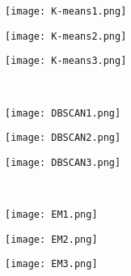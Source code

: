 \documentclass[11pt,a4paper,fleqn]{article}
\begin{document}
\begin{figure}[t!]
\begin{subfigure}{.3\textwidth}
\texttt{[image: K-means1.png]}
\end{subfigure}
\begin{subfigure}{.3\textwidth}
\texttt{[image: K-means2.png]}
\end{subfigure}
\begin{subfigure}{.3\textwidth}
\texttt{[image: K-means3.png]}
\end{subfigure}\\
\begin{subfigure}{.3\textwidth}
\texttt{[image: DBSCAN1.png]}
\end{subfigure}
\begin{subfigure}{.3\textwidth}
\texttt{[image: DBSCAN2.png]}
\end{subfigure}
\begin{subfigure}{.3\textwidth}
\texttt{[image: DBSCAN3.png]}
\end{subfigure}\\
\begin{subfigure}{.3\textwidth}
\texttt{[image: EM1.png]}
\end{subfigure}
\begin{subfigure}{.3\textwidth}
\texttt{[image: EM2.png]}
\end{subfigure}
\begin{subfigure}{.3\textwidth}
\texttt{[image: EM3.png]}
\end{subfigure}
\end{figure}
\end{document}

